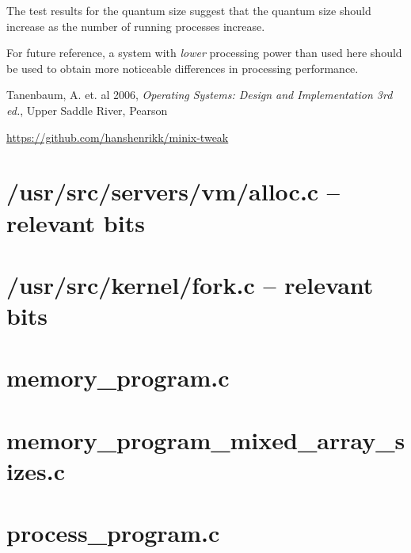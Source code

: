 \documentclass[11pt]{article}
\begin{document}
The test results for the quantum size suggest that the quantum size should increase as the number of running processes increase.

For future reference, a system with \emph{lower} processing power than used here should be used to obtain more noticeable differences in processing performance.

\begin{thebibliography}{4}
		Tanenbaum, A. et. al 2006,
		\emph{Operating Systems: Design and Implementation 3rd ed.},
		Upper Saddle River,
		Pearson
	
		\url{https://github.com/hanshenrikk/minix-tweak}
\end{thebibliography}

\clearpage
\appendix
\section{/usr/src/servers/vm/alloc.c -- relevant bits}
\label{app:alloc}


\clearpage
\section{/usr/src/kernel/fork.c -- relevant bits}
\label{app:fork.c}


\clearpage
\section{memory\_program.c}
\label{app:memory_program}


\clearpage
\section{memory\_program\_mixed\_array\_sizes.c}
\label{app:memory_program_mixed}


\clearpage
\section{process\_program.c}
\label{app:process_program}

\end{document}
